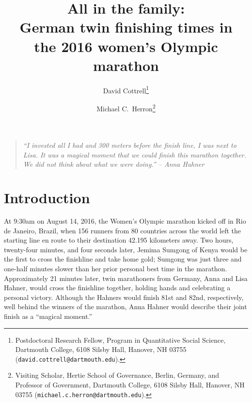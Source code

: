 \documentclass[12pt,titlepage]{article}
\begin{document}
\sloppy
\thispagestyle{empty}


\renewcommand{\topfraction}{.85}
\renewcommand{\bottomfraction}{.7}
\renewcommand{\textfraction}{.15}
\renewcommand{\floatpagefraction}{.66}
\renewcommand{\dbltopfraction}{.66}
\renewcommand{\dblfloatpagefraction}{.66}

\newcommand{\Yi}{\ensuremath{Y_i}}



\title{\Large{All in the family:\\German twin finishing times in\\the
    2016 women's Olympic marathon}}\author{David
  Cottrell\thanks{Postdoctoral Research Fellow, Program in
    Quantitative Social Science, Dartmouth College, 6108 Silsby Hall,
    Hanover, NH 03755 (\texttt{david.cottrell@dartmouth.edu}).} \and
  Michael C.\ Herron\thanks{Visiting Scholar, Hertie School of
    Governance, Berlin, Germany, and Professor of Government,
    Dartmouth College, 6108 Silsby Hall, Hanover, NH 03755
    (\texttt{michael.c.herron@dartmouth.edu}).}}


\maketitle \doublespacing 




\begin{quote}
  \emph{``I invested all I had and 300 meters before the finish line,
    I was next to Lisa. It was a magical moment that we could finish
    this marathon together. We did not think about what we were
    doing.'' -- Anna Hahner}
\end{quote}


\section*{Introduction}

At 9:30am on August 14, 2016, the Women's Olympic marathon kicked off
in Rio de Janeiro, Brazil, when 156 runners from 80 countries across
the world left the starting line en route to their destination 42.195
kilometers away. Two hours, twenty-four minutes, and four seconds
later, Jemima Sumgong of Kenya would be the first to cross the
finishline and take home gold; Sumgong was just three and one-half
minutes slower than her prior personal best time in the
marathon. Approximately 21 minutes later, twin marathoners from
Germany, Anna and Lisa Hahner, would cross the finishline together,
holding hands and celebrating a personal victory. Although the Hahners
would finish 81st and 82nd, respectively, well behind the winners of
the marathon, Anna Hahner would describe their joint finish as a
``magical moment.''
\end{document}
